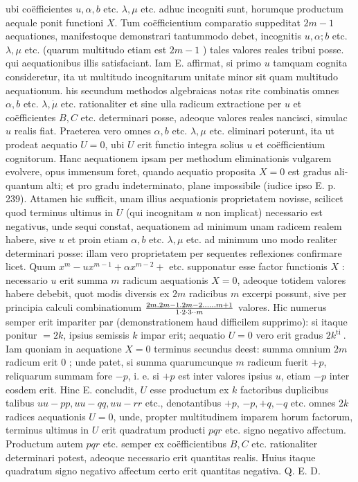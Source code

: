 \documentclass[twoside,12pt, showframe]{memoir}
\let\oldfrac\frac
\def\frac#1#2{\mathchoice{\tfrac{#1}{#2}}{\oldfrac{#1}{#2}}{\genfrac{}{}{}{2}{#1}{#2\mathstrut}}{\genfrac{}{}{}{3}{#1}{#2\mathstrut}}}
\begin{document}
ubi coëfficientes \(u, \alpha, b\) etc. \(\lambda, \mu\) etc. adhuc incogniti sunt, horumque productum aequale ponit functioni \(X\). Tum coëfficientium comparatio suppeditat \(2 m-1\) aequationes, manifestoque demonstrari tantummodo debet, incognitis \(u, \alpha ; b\) etc. \(\lambda, \mu\) etc. (quarum multitudo etiam est \(2 m-1\) ) tales valores reales tribui posse. qui aequationibus illis satisfaciant. Iam E. affirmat, si primo \(u\) tamquam cognita consideretur, ita ut multitudo incognitarum unitate minor sit quam multitudo aequationum. his secundum methodos algebraicas notas rite combinatis omnes \(\alpha, b\) etc. \(\lambda, \dot{\mu}\) etc. rationaliter et sine ulla radicum extractione per \(u\) et coëfficientes \(B, C\) etc. determinari posse, adeoque valores reales nancisci, simulac \(u\) realis fiat. Praeterea vero omnes \(\alpha, b\) etc. \(\lambda, \mu\) etc. eliminari poterunt, ita ut prodeat aequatio \(U=0\), ubi \(U\) erit functio integra solius \(u\) et coëfficientium cognitorum. Hanc aequationem ipsam per methodum eliminationis vulgarem evolvere, opus immensum foret, quando aequatio proposita \(X=0\) est gradus ali-
quantum alti; et pro gradu indeterminato, plane impossibile (iudice ipso E. p. 239). Attamen hic sufficit, unam illius aequationis proprietatem novisse, scilicet quod terminus ultimus in \(U\) (qui incognitam \(u\) non implicat) necessario est negativus, unde sequi constat, aequationem ad minimum unam radicem realem habere, sive \(u\) et proin etiam \(\alpha, b\) etc. \(\lambda, \mu\) etc. ad minimum uno modo realiter determinari posse: illam vero proprietatem per sequentes reflexiones confirmare licet. Quum \(x^{m}-u x^{m-1}+\alpha x^{m-2}+\) etc. supponatur esse factor functionis \(X\) : necessario \(u\) erit summa \(m\) radicum aequationis \(X=0\), adeoque totidem valores habere debebit, quot modis diversis ex \(2 m\) radicibus \(m\) excerpi possunt, sive per principia calculi combinationum \(\frac{2 m .2 m-1.2 m-2 \ldots \ldots m+1}{1 \cdot 2 \cdot 3 \cdot \cdot m}\) valores. Hic numerus semper erit impariter par (demonstrationem haud difficilem supprimo): si itaque ponitur \(=2 k\), ipsius semissis \(k\) impar erit; aequatio \(U=0\) vero erit gradus \(2 k^{\text {ti }}\). Iam quoniam in aequatione \(X=0\) terminus secundus deest: summa omnium \(2 m\) radicum erit 0 ; unde patet, si summa quarumcunque \(m\) radicum fuerit \(+p\), reliquarum summam fore \(-p\), i. e. si \(+p\) est inter valores ipsius \(u\), etiam \(-p\) inter eosdem erit. Hinc E. concludit, \(U\) esse productum ex \(k\) factoribus duplicibus talibus \(u u-p p, u u-q q, u u-r r\) etc., denotantibus \(+p\), \(-p,+q,-q\) etc. omnes \(2 k\) radices aequationis \(U=0\), unde, propter multitudinem imparem horum factorum, terminus ultimus in \(U\) erit quadratum producti \(p q r\) etc. signo negativo affectum. Productum autem \(p q r\) etc. semper ex coëfficientibus \(B, C\) etc. rationaliter determinari potest, adeoque necessario erit quantitas realis. Huius itaque quadratum signo negativo affectum certo erit quantitas negativa. Q. E. D.
\end{document}
